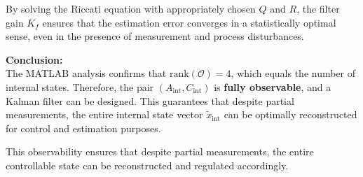 \documentclass[]{report}
\begin{document}
By solving the Riccati equation with appropriately chosen $Q$ and $R$, the filter gain $K_f$ ensures that the estimation error converges in a statistically optimal sense, even in the presence of measurement and process disturbances.

\textbf{Conclusion:} \\
The MATLAB analysis confirms that $\text{rank}(\mathcal{O}) = 4$, which equals the number of internal states. Therefore, the pair $(A_{\text{int}}, C_{\text{int}})$ is \textbf{fully observable}, and a Kalman filter can be designed. This guarantees that despite partial measurements, the entire internal state vector $\tilde{x}_{\text{int}}$ can be optimally reconstructed for control and estimation purposes.

This observability ensures that despite partial measurements, the entire controllable state can be reconstructed and regulated accordingly.

	
	
\end{document}
